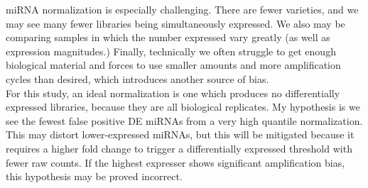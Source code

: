 \documentclass{bioinfo}
\begin{document}
miRNA normalization is especially challenging. There are fewer varieties, and we may see many fewer libraries being simultaneously expressed. We also may be comparing samples in which the number expressed vary greatly (as well as expression magnitudes.) Finally, technically we often struggle to get enough biological material and forces to use smaller amounts and more amplification cycles than desired, which introduces another source of bias.  \vspace{4pt} \\

For this study, an ideal normalization is one which produces no differentially expressed libraries, because they are all biological replicates. My hypothesis is we see the fewest false positive DE miRNAs from a very high quantile normalization. This may distort lower-expressed miRNAs, but this will be mitigated because it requires a higher fold change to trigger a differentially expressed threshold with fewer raw counts. If the highest expresser shows significant amplification bias, this hypothesis may be proved incorrect. \\
\end{document}
